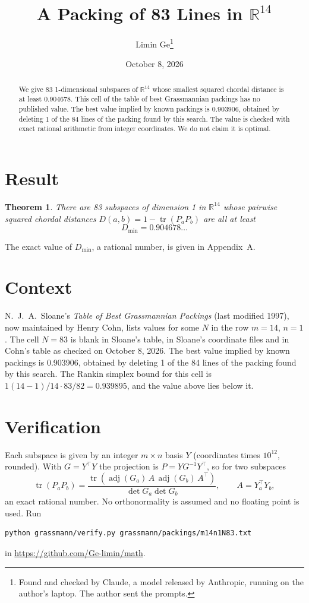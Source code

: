\documentclass[11pt,a4paper]{article}
\title{A Packing of 83 Lines in $\mathbb{R}^{14}$}
\author{Limin Ge\thanks{Found and checked by Claude, a model released by Anthropic, running on the author's laptop. The author sent the prompts.}}
\date{October 8, 2026}
\newtheorem*{theorem}{Theorem}
\begin{document}
\maketitle
\begin{abstract}
We give 83 1-dimensional subspaces of $\mathbb{R}^{14}$ whose smallest squared chordal distance is at least 0.904678. This cell of the table of best Grassmannian packings has no published value. The best value implied by known packings is 0.903906, obtained by deleting 1 of the 84 lines of the packing found by this search. The value is checked with exact rational arithmetic from integer coordinates. We do not claim it is optimal.
\end{abstract}

\section{Result}
\begin{theorem}
There are 83 subspaces of dimension 1 in $\mathbb{R}^{14}$ whose pairwise squared chordal distances $D(a,b) = 1 - \operatorname{tr}(P_aP_b)$ are all at least
\[ D_{\min} = 0.904678\ldots \]
\end{theorem}
The exact value of $D_{\min}$, a rational number, is given in Appendix~A.


\section{Context}
N.~J.~A.~Sloane's \emph{Table of Best Grassmannian Packings} (last modified 1997), now maintained by Henry Cohn, lists values for some $N$ in the row $m=14$, $n=1$. The cell $N=83$ is blank in Sloane's table, in Sloane's coordinate files and in Cohn's table as checked on October 8, 2026. The best value implied by known packings is 0.903906, obtained by deleting 1 of the 84 lines of the packing found by this search. The Rankin simplex bound for this cell is $1(14-1)/14\cdot 83/82 = 0.939895$, and the value above lies below it.


\section{Verification}
Each subspace is given by an integer $m\times n$ basis $Y$ (coordinates times $10^{12}$, rounded). With $G=Y^\top Y$ the projection is $P=YG^{-1}Y^\top$, so for two subspaces
\[ \operatorname{tr}(P_aP_b)=\frac{\operatorname{tr}(\operatorname{adj}(G_a)\,A\,\operatorname{adj}(G_b)\,A^\top)}{\det G_a\det G_b},\qquad A=Y_a^\top Y_b, \]
an exact rational number. No orthonormality is assumed and no floating point is used. Run
\begin{verbatim}
python grassmann/verify.py grassmann/packings/m14n1N83.txt
\end{verbatim}
in \url{https://github.com/Ge-limin/math}.
\end{document}
